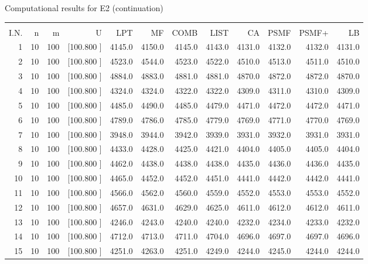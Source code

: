 \documentclass[12pt,a4paper]{article}
\begin{document}
\begin{center}
 Computational results for E2 (continuation) {\tiny
\begin{tabular}{r r r r r r r r r r r r}\hline
    &   &   &          &        &        &        &        &        &        &        &       \\[-0.1in]
  I.N.  &  n  &  m  &  U  &  LPT  &  MF  &  COMB  &  LIST  &  CA  & PSMF &PSMF+ & LB \\[0.03in]
\hline
   1& 10&100&[100.800   ]&  4145.0&  4150.0&  4145.0&  4143.0&  4131.0&  4132.0&  4132.0&  4131.0\\[-0.02in]
   2& 10&100&[100.800   ]&  4523.0&  4544.0&  4523.0&  4522.0&  4510.0&  4513.0&  4511.0&  4510.0\\[-0.02in]
   3& 10&100&[100.800   ]&  4884.0&  4883.0&  4881.0&  4881.0&  4870.0&  4872.0&  4872.0&  4870.0\\[-0.02in]
   4& 10&100&[100.800   ]&  4324.0&  4324.0&  4322.0&  4322.0&  4309.0&  4311.0&  4310.0&  4309.0\\[-0.02in]
   5& 10&100&[100.800   ]&  4485.0&  4490.0&  4485.0&  4479.0&  4471.0&  4472.0&  4472.0&  4471.0\\[-0.02in]
   6& 10&100&[100.800   ]&  4789.0&  4786.0&  4785.0&  4779.0&  4769.0&  4771.0&  4770.0&  4769.0\\[-0.02in]
   7& 10&100&[100.800   ]&  3948.0&  3944.0&  3942.0&  3939.0&  3931.0&  3932.0&  3931.0&  3931.0\\[-0.02in]
   8& 10&100&[100.800   ]&  4433.0&  4428.0&  4425.0&  4421.0&  4404.0&  4405.0&  4405.0&  4404.0\\[-0.02in]
   9& 10&100&[100.800   ]&  4462.0&  4438.0&  4438.0&  4438.0&  4435.0&  4436.0&  4436.0&  4435.0\\[-0.02in]
  10& 10&100&[100.800   ]&  4465.0&  4452.0&  4452.0&  4451.0&  4441.0&  4442.0&  4442.0&  4441.0\\[-0.02in]
  11& 10&100&[100.800   ]&  4566.0&  4562.0&  4560.0&  4559.0&  4552.0&  4553.0&  4553.0&  4552.0\\[-0.02in]
  12& 10&100&[100.800   ]&  4657.0&  4631.0&  4629.0&  4625.0&  4611.0&  4612.0&  4612.0&  4611.0\\[-0.02in]
  13& 10&100&[100.800   ]&  4246.0&  4243.0&  4240.0&  4240.0&  4232.0&  4234.0&  4233.0&  4232.0\\[-0.02in]
  14& 10&100&[100.800   ]&  4712.0&  4713.0&  4711.0&  4704.0&  4696.0&  4697.0&  4697.0&  4696.0\\[-0.02in]
  15& 10&100&[100.800   ]&  4251.0&  4263.0&  4251.0&  4249.0&  4244.0&  4245.0&  4244.0&  4244.0\\[-0.02in]

\end{tabular}}
\end{center}
\end{document}
